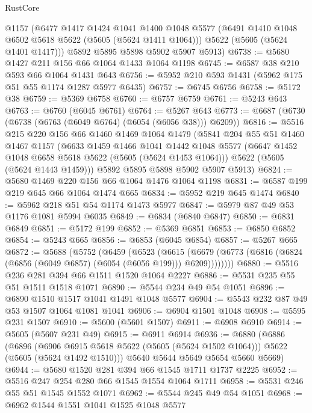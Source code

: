 \begin{lexlean}{RustCore}
\begin{coremodule}
      @1157
      (@6477
        @1417
        @1424
        @1041
        @1400
        @1048
        @5577
        (@6491 @1410 @1048 @6502 @5618 @5622 (@5605 (@5624 @1411 @1064)))
        @5622
        (@5605 (@5624 @1401 @1417)))
      @5892
      @5895
      @5898
      @5902
      @5907
      @5913)
@6738 := @5680 @1427 @211 @156 @66 @1064 @1433 @1064 @1198
@6745 := @6587 @38 @210 @593 @66 @1064 @1431 @643
@6756 := @5952 @210 @593 @1431 (@5962 @175 @51 @55 @1174 @1287 @5977 @6435)
@6757 := @6745 @6756
@6758 := @5172 @38
@6759 := @5369 @6758
@6760 := @6757 @6759
@6761 := @5243 @643
@6763 := @6760 (@6045 @6761)
@6764 := @5267 @643
@6773 := @6687 (@6730 (@6738 (@6763 (@6049 @6764) (@6054 (@6056 @38))) @6209))
@6816 := @5516
    @215
    @220
    @156
    @66
    @1460
    @1469
    @1064
    @1479
    (@5841
      @204
      @55
      @51
      @1460
      @1467
      @1157
      (@6633
        @1459
        @1466
        @1041
        @1442
        @1048
        @5577
        (@6647 @1452 @1048 @6658 @5618 @5622 (@5605 (@5624 @1453 @1064)))
        @5622
        (@5605 (@5624 @1443 @1459)))
      @5892
      @5895
      @5898
      @5902
      @5907
      @5913)
@6824 := @5680 @1469 @220 @156 @66 @1064 @1476 @1064 @1198
@6831 := @6587 @199 @219 @645 @66 @1064 @1474 @665
@6834 := @5952 @219 @645 @1474
@6840 := @5962 @218 @51 @54 @1174 @1473 @5977
@6847 := @5979 @87 @49 @53 @1176 @1081 @5994 @6035
@6849 := @6834 (@6840 @6847)
@6850 := @6831 @6849
@6851 := @5172 @199
@6852 := @5369 @6851
@6853 := @6850 @6852
@6854 := @5243 @665
@6856 := @6853 (@6045 @6854)
@6857 := @5267 @665
@6872 := @5688
    (@5752
      (@6459
        (@6523
          (@6615
            (@6679 (@6773 (@6816 (@6824 (@6856 (@6049 @6857) (@6054 (@6056 @199))) @6209))))))))
@6880 := @5516 @236 @281 @394 @66 @1511 @1520 @1064 @2227
@6886 := @5531 @235 @55 @51 @1511 @1518 @1071
@6890 := @5544 @234 @49 @54 @1051
@6896 := @6890 @1510 @1517 @1041 @1491 @1048 @5577
@6904 := @5543 @232 @87 @49 @53 @1507 @1064 @1081 @1041
@6906 := @6904 @1501 @1048
@6908 := @5595 @231 @1507
@6910 := @5600 (@5601 @1507)
@6911 := @6908 @6910
@6914 := @5605 (@5607 @231 @49)
@6915 := @6911 @6914
@6936 := @6880
    (@6886
      (@6896
        (@6906 @6915 @5618 @5622 (@5605 (@5624 @1502 @1064)))
        @5622
        (@5605 (@5624 @1492 @1510)))
      @5640
      @5644
      @5649
      @5654
      @5660
      @5669)
@6944 := @5680 @1520 @281 @394 @66 @1545 @1711 @1737 @2225
@6952 := @5516 @247 @254 @280 @66 @1545 @1554 @1064 @1711
@6958 := @5531 @246 @55 @51 @1545 @1552 @1071
@6962 := @5544 @245 @49 @54 @1051
@6968 := @6962 @1544 @1551 @1041 @1525 @1048 @5577

\end{coremodule}
\end{lexlean}
